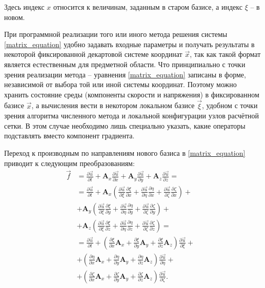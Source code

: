 Здесь индекс $x$ относится к величинам, заданным в старом базисе, а индекс $\xi$ -- в новом.

При программной реализации того или иного метода решения системы \ref{matrix_equation} удобно задавать входные параметры и получать результаты в некоторой фиксированной декартовой системе координат $\vec x$, так как такой формат является естественным для предметной области. Что принципиально с точки зрения реализации метода -- уравнения \ref{matrix_equation} записаны в форме, независимой от выбора той или иной системы координат. Поэтому можно хранить состояние среды (компоненты скорости и напряжения) в фиксированном базисе $\vec x$, а вычисления вести в некотором локальном базисе $\vec \xi$, удобном с точки зрения алгоритма численного метода и локальной конфигурации узлов расчётной сетки. В этом случае необходимо лишь специально указать, какие операторы подставлять вместо компонент градиента.

Переход к производным по направлениям нового базиса в \ref{matrix_equation} приводит к следующим преобразованиям:
\begin{align}
\nonumber
\vec{f} &= \frac{\partial\vec{u}}{\partial{t}} + 
\mathbf{A}_x\frac{\partial\vec{u}}{\partial{x}} + 
\mathbf{A}_y\frac{\partial\vec{u}}{\partial{y}} + 
\mathbf{A}_z\frac{\partial\vec{u}}{\partial{z}} =
& \nonumber\\
&= \frac{\partial\vec{u}}{\partial{t}} + 
\mathbf{A}_x (\frac{\partial\vec{u}}{\partial{\xi}}\frac{\partial{\xi}}{\partial{x}} + 
\frac{\partial\vec{u}}{\partial{\eta}}\frac{\partial{\eta}}{\partial{x}} + 
\frac{\partial\vec{u}}{\partial{\zeta}}\frac{\partial{\zeta}}{\partial{x}} ) + 
& \nonumber\\
& + \mathbf{A}_y (\frac{\partial\vec{u}}{\partial{\xi}}\frac{\partial{\xi}}{\partial{y}} + 
\frac{\partial\vec{u}}{\partial{\eta}}\frac{\partial{\eta}}{\partial{y}} + 
\frac{\partial\vec{u}}{\partial{\zeta}}\frac{\partial{\zeta}}{\partial{y}} ) + 
& \nonumber\\
& + \mathbf{A}_z (\frac{\partial\vec{u}}{\partial{\xi}}\frac{\partial{\xi}}{\partial{z}} + 
\frac{\partial\vec{u}}{\partial{\eta}}\frac{\partial{\eta}}{\partial{z}} + 
\frac{\partial\vec{u}}{\partial{\zeta}}\frac{\partial{\zeta}}{\partial{z}} ) = 
& \nonumber\\
& = \frac{\partial\vec{u}}{\partial{t}} + 
( \frac{\partial{\xi}}{\partial{x}} \mathbf{A}_x  + 
\frac{\partial{\xi}}{\partial{y}} \mathbf{A}_y + 
\frac{\partial{\xi}}{\partial{z}} \mathbf{A}_z ) \frac{\partial\vec{u}}{\partial{\xi}} + 
& \nonumber\\
& + ( \frac{\partial{\eta}}{\partial{x}} \mathbf{A}_x + 
\frac{\partial{\eta}}{\partial{y}} \mathbf{A}_y + 
\frac{\partial{\eta}}{\partial{z}} \mathbf{A}_z ) \frac{\partial\vec{u}}{\partial{\eta}} + 
& \nonumber\\
& + ( \frac{\partial{\zeta}}{\partial{x}} \mathbf{A}_x  + 
\frac{\partial{\zeta}}{\partial{y}} \mathbf{A}_y + 
\frac{\partial{\zeta}}{\partial{z}} \mathbf{A}_z ) \frac{\partial\vec{u}}{\partial{\zeta}}.
\end{align}

